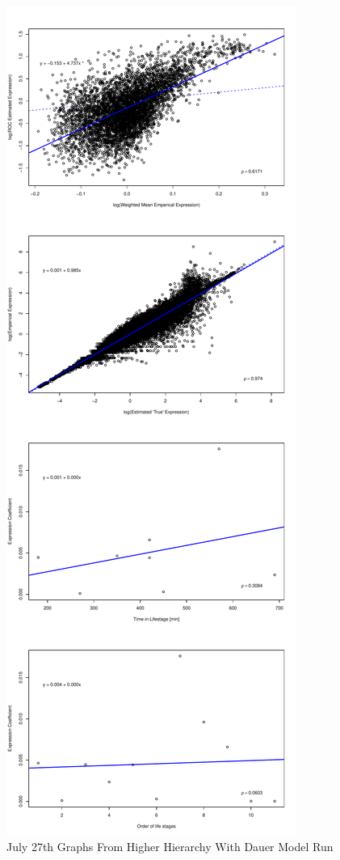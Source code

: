 \documentclass[letterpaper,index=totoc,hyperref,openany]{labbook} %
\begin{document}
\begin{figure}[H]
\begin{center}
\includegraphics[scale=.45]{../Higher_Hierarchy_with_Dauer_1/Plots/Higher_hierarchy_with_dauer_original_model_celegans_weighted_expr_vector_beta_noise_fixed_sroc_withIntercept.pdf}
\end{center}
\caption{July 27th Graphs From Higher Hierarchy With Dauer Model Run}
\end{figure}
\end{document}
